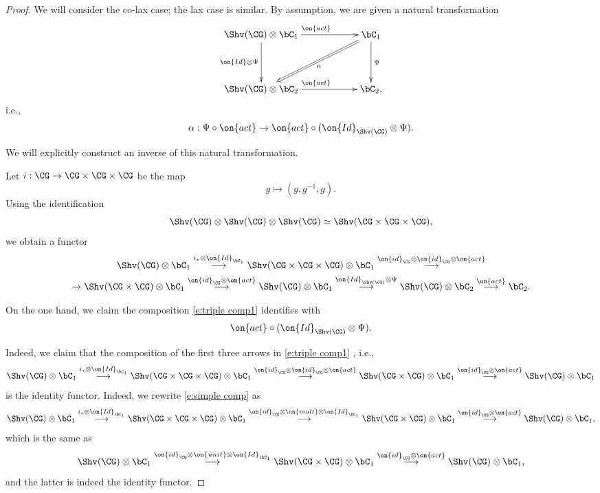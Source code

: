 \documentclass[9pt]{amsart}
\theoremstyle{definition}
\theoremstyle{remark}
\numberwithin{equation}{section}
\begin{document}
\begin{proof}

We will consider the co-lax case; the lax case is similar. By assumption, we are given a natural transformation
$$
\xy
(0,0)*+{\Shv(\CG)\otimes \bC_1}="A";
(40,0)*+{\bC_1}="B";
(0,-20)*+{\Shv(\CG)\otimes  \bC_2}="C";
(40,-20)*+{\bC_2,}="D";
{\ar@{->}_{\on{Id}\otimes \Psi} "A";"C"};
{\ar@{->}^{\on{act}}"A";"B"};
{\ar@{->}^{\on{act}} "C";"D"};
{\ar@{->}^{\Psi} "B";"D"};
{\ar@{=>}^\alpha "B";"C"};
\endxy
$$
i.e., $$\alpha: \Psi\circ \on{act}\to \on{act}\circ (\on{Id}_{\Shv(\CG)}\otimes \Psi).$$

We will explicitly construct an inverse of this natural transformation.   

\medskip

Let $i:\CG\to \CG\times \CG\times \CG$ be the map
$$g\mapsto (g,g^{-1},g).$$
Using the identification
\begin{equation} \label{e:triple}
\Shv(\CG)\otimes \Shv(\CG)\otimes \Shv(\CG)\simeq \Shv(\CG\times \CG\times \CG),
\end{equation} 
we obtain a functor
\begin{multline}  \label{e:triple comp1}
\Shv(\CG)\otimes \bC_1 \overset{i_*\otimes \on{Id}_{\bC_1}}\longrightarrow \Shv(\CG\times \CG\times \CG)\otimes \bC_1
\overset{\on{id}_\CG\otimes \on{id}_\CG \otimes \on{act}} \longrightarrow \\
\to \Shv(\CG\times \CG)\otimes \bC_1
\overset{\on{id}_\CG\otimes\on{act}} \longrightarrow \Shv(\CG)\otimes \bC_1 \overset{\on{Id}_{\Shv(\CG)}\otimes \Psi}
 \longrightarrow \Shv(\CG)\otimes \bC_2 \overset{\on{act}}\longrightarrow \bC_2.
 \end{multline} 

On the one hand, we claim the composition \eqref{e:triple comp1} identifies with
$$\on{act}\circ (\on{Id}_{\Shv(\CG)}\otimes \Psi).$$

Indeed, we claim that the composition of the first three arrows in  \eqref{e:triple comp1} , i.e., 
\begin{equation} \label{e:simple comp}
\Shv(\CG)\otimes \bC_1 \overset{i_*\otimes \on{Id}_{\bC_1}}\longrightarrow \Shv(\CG\times \CG\times \CG)\otimes \bC_1
\overset{\on{id}_\CG\otimes \on{id}_\CG \otimes \on{act}} \longrightarrow \Shv(\CG\times \CG)\otimes \bC_1
\overset{\on{id}_\CG\otimes \on{act}} \longrightarrow \Shv(\CG)\otimes \bC_1
\end{equation}
is the identity functor. Indeed, we rewrite \eqref{e:simple comp} as
$$
\Shv(\CG)\otimes \bC_1 \overset{i_*\otimes \on{Id}_{\bC_1}}\longrightarrow \Shv(\CG\times \CG\times \CG)\otimes \bC_1
\overset{\on{id}_\CG\otimes \on{mult}\otimes \on{Id}_{\bC_1}}\longrightarrow  \Shv(\CG\times \CG)\otimes \bC_1 
\overset{\on{id}_\CG\otimes \on{act}} \longrightarrow \Shv(\CG)\otimes \bC_1,$$
which is the same as
$$\Shv(\CG)\otimes \bC_1 \overset{\on{id}_\CG\otimes \on{unit}\otimes \on{Id}_{\bC_1}}
\longrightarrow  \Shv(\CG\times \CG)\otimes \bC_1 
\overset{\on{id}_\CG\otimes \on{act}} \longrightarrow \Shv(\CG)\otimes \bC_1,$$
and the latter is indeed the identity functor. 


\end{proof}
\end{document}
